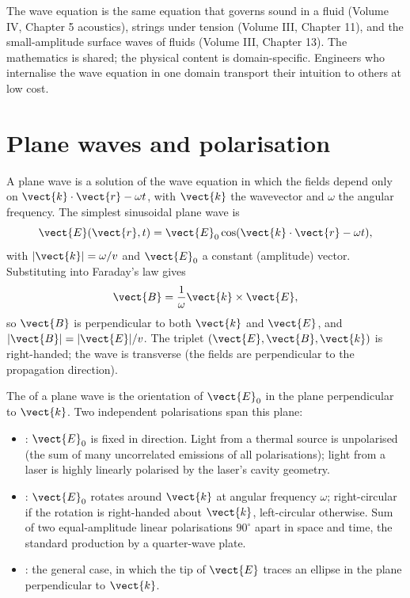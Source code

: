 The wave equation is the same equation that governs sound in a fluid
(Volume IV, Chapter 5 acoustics), strings under tension (Volume III,
Chapter 11), and the small-amplitude surface waves of fluids (Volume
III, Chapter 13). The mathematics is shared; the physical content is
domain-specific. Engineers who internalise the wave equation in one
domain transport their intuition to others at low cost.

\section{Plane waves and polarisation}

A plane wave is a solution of the wave equation in which the fields
depend only on $\vect{k}\cdot \vect{r} - \omega t$, with $\vect{k}$
the wavevector and $\omega$ the angular frequency. The simplest
sinusoidal plane wave is
\[
\vect{E}(\vect{r}, t) = \vect{E}_{0}\cos(\vect{k}\cdot \vect{r} -
\omega t),
\]
with $|\vect{k}| = \omega/v$ and $\vect{E}_{0}$ a constant
(amplitude) vector. Substituting into Faraday's law gives
\[
\vect{B} = \frac{1}{\omega}\vect{k}\times \vect{E},
\]
so $\vect{B}$ is perpendicular to both $\vect{k}$ and $\vect{E}$, and
$|\vect{B}| = |\vect{E}|/v$. The triplet $(\vect{E}, \vect{B},
\vect{k})$ is right-handed; the wave is transverse (the fields are
perpendicular to the propagation direction).



The  of a plane wave is the orientation of
$\vect{E}_{0}$ in the plane perpendicular to $\vect{k}$. Two
independent polarisations span this plane:
\begin{itemize}[leftmargin=*]
  \item {}: $\vect{E}_{0}$ is fixed in
    direction. Light from a thermal source is unpolarised (the sum
    of many uncorrelated emissions of all polarisations); light from
    a laser is highly linearly polarised by the laser's cavity
    geometry.
  \item {}: $\vect{E}_{0}$ rotates around
    $\vect{k}$ at angular frequency $\omega$; right-circular if the
    rotation is right-handed about $\vect{k}$, left-circular
    otherwise. Sum of two equal-amplitude linear polarisations
    $90^{\circ}$ apart in space and time, the standard production by
    a quarter-wave plate.
  \item {}: the general case, in which
    the tip of $\vect{E}$ traces an ellipse in the plane perpendicular
    to $\vect{k}$.
\end{itemize}

